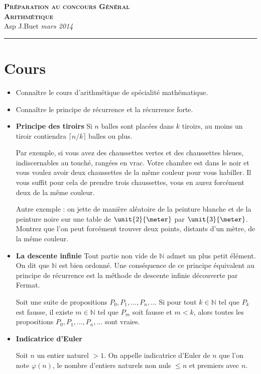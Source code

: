 \documentclass[10pt,a4paper]{article}
\newcommand{\Titre}[3]{\begin{center} {\LARGE\textbf{\textsc{#1}}}\\ #2 \hfill \emph{#3} \\  \hrule\vspace{\baselineskip}\end{center}}
\begin{document}
\Titre{Préparation au concours Général \\  Arithmétique}{Asp J.Buet}{mars 2014}
\thispagestyle{plain}
\pagestyle{plain}



\section{Cours}

\begin{itemize}
\item Connaître le cours d'arithmétique de spécialité mathématique.
\bigskip
\item Connaître le principe de récurrence et la récurrence forte.
\bigskip
\item \textbf{Principe des tiroirs} Si $n$ balles sont placées dans $k$ tiroirs, au moins un tiroir contiendra $\lceil n/k \rceil$ balles ou plus.

\bigskip
Par exemple, si vous avez des chaussettes vertes et des chaussettes bleues, indiscernables au touché, rangées en vrac. Votre chambre est dans le noir et vous
 voulez avoir deux chaussettes de la même couleur pour vous habiller. Il vous suffit pour cela de prendre trois chaussettes, vous en aurez forcément deux de
la même couleur.

\bigskip
Autre exemple : on jette de manière aléatoire de la peinture blanche et de la peinture noire sur une table de $\unit{2}{\meter}$ par $\unit{3}{\meter}$. 
Montrez que l'on peut forcément trouver deux points, distants d'un mètre, de la même couleur.
\bigskip
\item \textbf{La descente infinie} Tout partie non vide de $\mathbb{N}$ admet un plus petit élément. On dit que $\mathbb{N}$ est bien ordonné. Une conséquence
de ce principe équivalent au principe de récurrence est la méthode de descente infinie découverte par Fermat.

Soit une suite de propositions $P_0,P_1,...,P_n,...$ Si pour tout $k\in\mathbb{N}$ tel que $P_k$ est fausse, il existe $m\in\mathbb{N}$ tel que $P_m$ soit 
fausse et $m<k$, alors toutes les propositions $P_0, P_1, ..., P_n, ...$ sont vraies.
\bigskip
\item \textbf{Indicatrice d'Euler}

Soit $n$ un entier naturel $>1$. On appelle indicatrice d'Euler de $n$ que l'on note $\varphi(n)$, le nombre d'entiers naturels non nuls $\leqslant n$ et premiers avec $n$.


\end{itemize}
\end{document}
